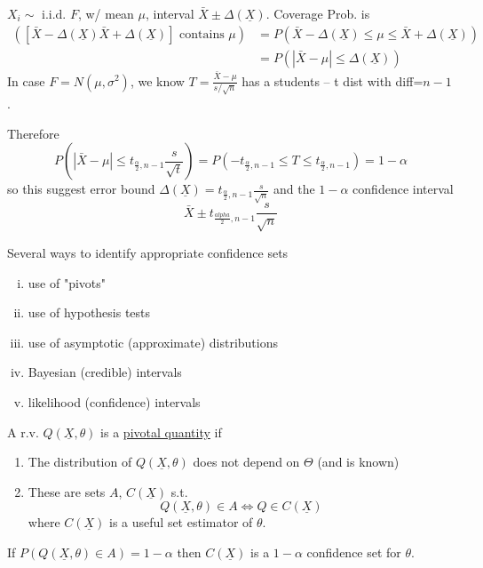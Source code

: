 \documentclass[english, 11pt]{article}
\newcommand{\lp}{\left(}
\newcommand{\rp}{\right)}
\begin{document}
\begin{exmp}
$X_i\sim\text{ i.i.d. }F$, w/ mean $\mu$, interval $\bar{X}\pm\Delta(\underline{X})$. Coverage Prob. is 
$$
\begin{aligned}
([\bar{X}-\Delta(\underline{X}) \bar{X}+\Delta(\underline{X})]\text{ contains }\mu)&=P(\bar{X}-\Delta(\underline{X})\leqslant\mu\leqslant\bar{X}+\Delta(\underline{X}))\\
&=P(|\bar{X}-\mu|\leqslant\Delta(\underline{X}))
\end{aligned}
$$
In case $F=N(\mu, \sigma^2)$, we know $T=\frac{\bar{X}-\mu}{s/\sqrt{n}}$ has a students -- t dist with diff=$n-1$.

Therefore
$$
P\lp|\bar{X}-\mu|\leqslant t_{\frac{\alpha}{2},n-1}\frac{s}{\sqrt{t}}\rp=P\lp -t_{\frac{\alpha}{2}, n-1}\leqslant T\leqslant t_{\frac{\alpha}{2}, n-1}\rp=1-\alpha
$$
so this suggest error bound $\Delta(\underline{X})=t_{\frac{\alpha}{2}, n-1}\frac{s}{\sqrt{n}}$ and the $1-\alpha$ confidence interval
$$
\bar{X}\pm t_{\frac{alpha}{2}, n-1}\frac{s}{\sqrt{n}}
$$

Several ways to identify appropriate confidence sets
\begin{enumerate}[i)]
\item use of "pivots"
\item use of hypothesis tests
\item use of asymptotic (approximate) distributions
\item Bayesian (credible) intervals
\item likelihood (confidence) intervals
\end{enumerate}
\end{exmp}

\begin{defn}
A r.v. $Q(\underline{X}, \theta)$ is a \underline{pivotal quantity} if
\begin{enumerate}
\item The distribution of $Q(\underline{X}, \theta)$ does not depend on $\Theta$ (and is known)
\item  These are sets $A$, $C(\underline{X})$ s.t.
$$
Q(\underline{X}, \theta)\in A\Leftrightarrow Q\in C(\underline{X})
$$
where $C(\underline{X})$ is a useful set estimator of $\theta$.
\end{enumerate}
If $P(Q(\underline{X}, \theta)\in A)=1-\alpha$ then $C(\underline{X})$ is a $1-\alpha$ confidence set for $\theta$.
\end{defn}
\end{document}
